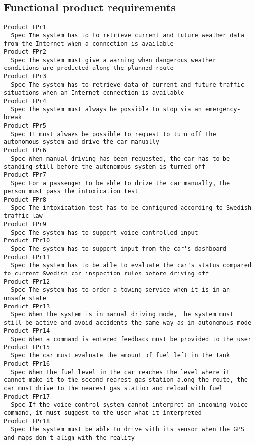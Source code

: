 \begin{lstlisting}

\end{lstlisting}


       \subsection{Functional product requirements}


\begin{lstlisting}
Product FPr1
  Spec The system has to to retrieve current and future weather data from the Internet when a connection is available
Product FPr2
  Spec The system must give a warning when dangerous weather conditions are predicted along the planned route
Product FPr3
  Spec The system has to retrieve data of current and future traffic situations when an Internet connection is available
Product FPr4
  Spec The system must always be possible to stop via an emergency-break
Product FPr5
  Spec It must always be possible to request to turn off the autonomous system and drive the car manually
Product FPr6
  Spec When manual driving has been requested, the car has to be standing still before the autonomous system is turned off
Product FPr7
  Spec For a passenger to be able to drive the car manually, the person must pass the intoxication test
Product FPr8
  Spec The intoxication test has to be configured according to Swedish traffic law
Product FPr9
  Spec The system has to support voice controlled input
Product FPr10
  Spec The system has to support input from the car's dashboard
Product FPr11
  Spec The system has to be able to evaluate the car's status compared to current Swedish car inspection rules before driving off
Product FPr12
  Spec The system has to order a towing service when it is in an unsafe state
Product FPr13
  Spec When the system is in manual driving mode, the system must still be active and avoid accidents the same way as in autonomous mode
Product FPr14
  Spec When a command is entered feedback must be provided to the user
Product FPr15
  Spec The car must evaluate the amount of fuel left in the tank
Product FPr16
  Spec When the fuel level in the car reaches the level where it cannot make it to the second nearest gas station along the route, the car must drive to the nearest gas station and reload with fuel
Product FPr17
  Spec If the voice control system cannot interpret an incoming voice command, it must suggest to the user what it interpreted
Product FPr18
  Spec The system must be able to drive with its sensor when the GPS and maps don't align with the reality

\end{lstlisting}
